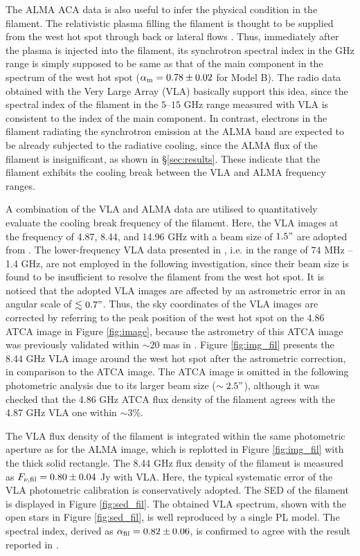 \documentclass[twocolumn]{aastex631}
\begin{document}
The ALMA ACA data is also useful to infer 
the physical condition in the filament.
The relativistic plasma filling the filament 
is thought to be supplied from the west hot spot 
through back or lateral flows \citep{mizuta2010,saxton2002}. 
Thus, immediately after the plasma is injected into the filament,
its synchrotron spectral index in the GHz range is 
simply supposed to be same as 
that of the main component in the spectrum of the west hot spot 
($\alpha_{\rm m} = 0.78 \pm 0.02$ for Model B).
The radio data obtained with the Very Large Array (VLA)
basically support this idea,
since the spectral index of the filament in the $5$--$15$ GHz range
measured with VLA \citep[$\alpha \sim 0.8$;][]{perley1997}
is consistent to the index of the main component.
In contrast, electrons in the filament radiating the synchrotron emission 
at the ALMA band are expected to be already subjected 
to the radiative cooling,
since the ALMA flux of the filament is insignificant, 
as shown in \S \ref{sec:results}.
These indicate that the filament exhibits 
the cooling break between the VLA and ALMA frequency ranges.

A combination of the VLA and ALMA data are utilised 
to quantitatively evaluate the cooling break frequency of the filament.
Here, the VLA images at the frequency of 4.87, 8.44, and 14.96 GHz 
with a beam size of $1.5"$ are adopted from \citet{perley1997}.
The lower-frequency VLA data presented in \citet{perley1997},
i.e. in the range of $74$ MHz -- 1.4 GHz, are not employed 
in the following investigation, 
since their beam size is found to be insufficient 
to resolve the filament from the west hot spot.
It is noticed that the adopted VLA images are affected by 
an astrometric error in an angular scale of $\lesssim 0.7"$. 
Thus, the sky coordinates of the VLA images are corrected 
by referring to the peak position of the west hot spot 
on the 4.86 ATCA image in Figure \ref{fig:image},
because the astrometry of this ATCA image was 
previously validated within $\sim 20$ mas in \citet{isobe2017}.
Figure \ref{fig:img_fil} presents
the 8.44 GHz VLA image around the west hot spot after the astrometric correction,
in comparison to the ATCA image.
The ATCA image is omitted in the following photometric analysis
due to its larger beam size ($\sim 2.5"$),
although it was checked that the 4.86 GHz ATCA flux density of the filament 
agrees with the 4.87 GHz VLA one within $\sim 3$\%.


The VLA flux density of the filament is integrated 
within the same photometric aperture as for the ALMA image,
which is replotted in Figure \ref{fig:img_fil} 
with the thick solid rectangle.
The 8.44 GHz flux density of the filament is measured  
as $F_{\nu, {\rm fil}}= 0.80 \pm 0.04$ Jy with VLA.
Here, the typical systematic error of the VLA photometric calibration
\citep[$5$\%;][]{perley2017} is conservatively adopted. 
The SED of the filament is displayed in Figure \ref{fig:sed_fil}.
The obtained VLA spectrum,
shown with the open stars in Figure \ref{fig:sed_fil},
is well reproduced by a single PL model.
The spectral index, derived as $\alpha_{\rm fil} = 0.82 \pm 0.06$,
is confirmed to agree with the result reported in \citet{perley1997}. 
\end{document}
